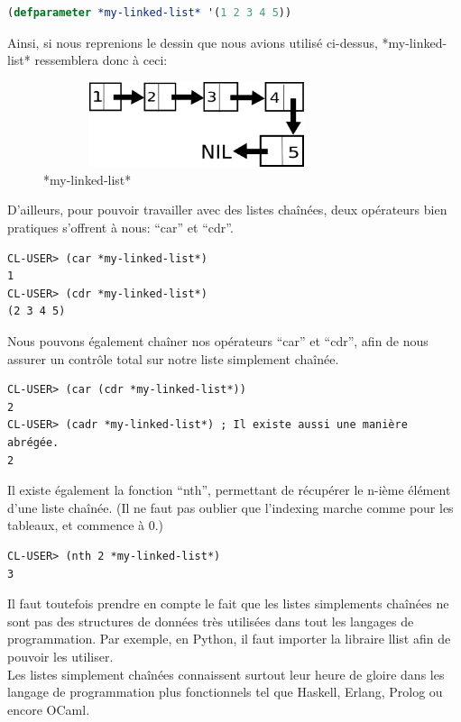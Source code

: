 \documentclass[a4paper, 12pt]{article}
\numberwithin{equation}{subsection}
\begin{document}
\begin{lstlisting}[language=Lisp]
(defparameter *my-linked-list* '(1 2 3 4 5))
\end{lstlisting}
Ainsi, si nous reprenions le dessin que nous avions utilisé ci-dessus,
*my-linked-list* ressemblera donc à ceci: \\
\begin{figure}[H]
  \centering
  \includegraphics[width=9.0cm, height=2.5cm]{imgs/my_linked_list.png}
  \caption{*my-linked-list*}
\end{figure}
D'ailleurs, pour pouvoir travailler avec des listes chaînées, deux opérateurs bien pratiques s'offrent à nous: ``car'' et ``cdr''. \\[0.2cm]
\begin{lstlisting}[language=LISP]
CL-USER> (car *my-linked-list*)
1
CL-USER> (cdr *my-linked-list*)
(2 3 4 5)
\end{lstlisting}
Nous pouvons également chaîner nos opérateurs ``car'' et ``cdr'', afin de nous assurer un contrôle total sur notre liste simplement chaînée.
\begin{lstlisting}[language=LISP]
CL-USER> (car (cdr *my-linked-list*))
2
CL-USER> (cadr *my-linked-list*) ; Il existe aussi une manière abrégée.
2
\end{lstlisting}
Il existe également la fonction ``nth'', permettant de récupérer le n-ième élément d'une liste chaînée. (Il ne faut pas oublier que l'indexing marche comme pour les tableaux, et commence à 0.)
\begin{lstlisting}[language=LISP]
CL-USER> (nth 2 *my-linked-list*)
3
\end{lstlisting}
Il faut toutefois prendre en compte le fait que les listes simplements chaînées ne sont pas des structures de données très utilisées dans tout les langages de programmation. Par exemple, en Python, il faut importer la libraire llist afin de pouvoir les utiliser. \\

Les listes simplement chaînées connaissent surtout leur heure de gloire dans les langage de programmation plus fonctionnels tel que Haskell, Erlang, Prolog ou encore OCaml.
\end{document}
